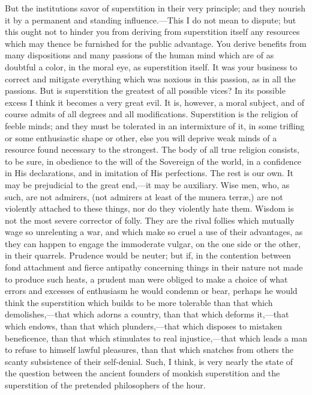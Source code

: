 But the institutions savor of superstition in their very principle; and they nourish it by a permanent and standing influence.—This I do not mean to dispute; but this ought not to hinder you from deriving from superstition itself any resources which may thence be furnished for the public advantage. You derive benefits from many dispositions and many passions of the human mind which are of as doubtful a color, in the moral eye, as superstition itself. It was your business to correct and mitigate everything which was noxious in this passion, as in all the passions. But is superstition the greatest of all possible vices? In its possible excess I think it becomes a very great evil. It is, however, a moral subject, and of course admits of all degrees and all modifications. Superstition is the religion of feeble minds; and they must be tolerated in an intermixture of it, in some trifling or some enthusiastic shape or other, else you will deprive weak minds of a resource found necessary to the strongest. The body of all true religion consists, to be sure, in obedience to the will of the Sovereign of the world, in a confidence in His declarations, and in imitation of His perfections. The rest is our own. It may be prejudicial to the great end,—it may be auxiliary. Wise men, who, as such, are not admirers, (not admirers at least of the munera terræ,) are not violently attached to these things, nor do they violently hate them. Wisdom is not the most severe corrector of folly. They are the rival follies which mutually wage so unrelenting a war, and which make so cruel a use of their advantages, as they can happen to engage the immoderate vulgar, on the one side or the other, in their quarrels. Prudence would be neuter; but if, in the contention between fond attachment and fierce antipathy concerning things in their nature not made to produce such heats, a prudent man were obliged to make a choice of what errors and excesses of enthusiasm he would condemn or bear, perhaps he would think the superstition which builds to be more tolerable than that which demolishes,—that which adorns a country, than that which deforms it,—that which endows, than that which plunders,—that which disposes to mistaken beneficence, than that which stimulates to real injustice,—that which leads a man to refuse to himself lawful pleasures, than that which snatches from others the scanty subsistence of their self-denial. Such, I think, is very nearly the state of the question between the ancient founders of monkish superstition and the superstition of the pretended philosophers of the hour.

